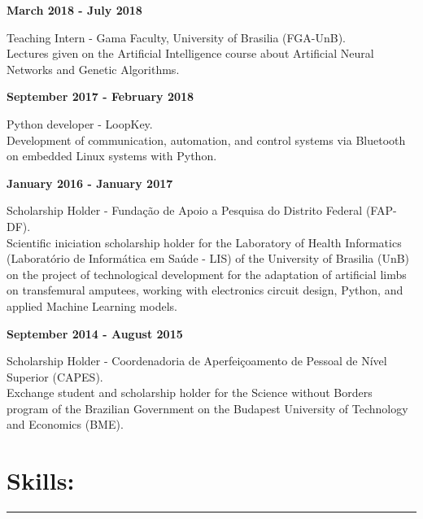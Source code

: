 \documentclass[11pt]{article}
\begin{document}
\textbf{March 2018 - July 2018}
\begin{addmargin}{0.5cm}
Teaching Intern - Gama Faculty, University of Brasilia (FGA-UnB).\\
Lectures given on the Artificial Intelligence  course  about Artificial Neural Networks
and Genetic Algorithms. \\
\end{addmargin}

\textbf{September 2017 - February 2018}
\begin{addmargin}{0.5cm}
Python developer - LoopKey.\\
Development of communication, automation, and control systems via Bluetooth on
embedded Linux systems with Python. \\
\end{addmargin}

\textbf{January 2016 - January 2017}
\begin{addmargin}{0.5cm}
Scholarship Holder - Fundação de Apoio a Pesquisa do Distrito Federal (FAP-DF).\\
Scientific iniciation scholarship holder for the Laboratory of Health Informatics
(Laboratório de Informática em Saúde - LIS) of the University of
Brasilia (UnB) on the project of technological development for the adaptation of artificial
limbs on transfemural amputees, working with electronics circuit design, Python, and applied
Machine Learning models. \\

\end{addmargin}

\textbf{September 2014 - August 2015}
\begin{addmargin}{0.5cm}
Scholarship Holder - Coordenadoria de Aperfeiçoamento de Pessoal de Nível Superior (CAPES). \\
Exchange student and scholarship holder for the Science without Borders program of the Brazilian
Government on the Budapest University of Technology and Economics (BME). \\
\end{addmargin}

\section{Skills:}
\hrule \vspace{0.1cm}
\end{document}
